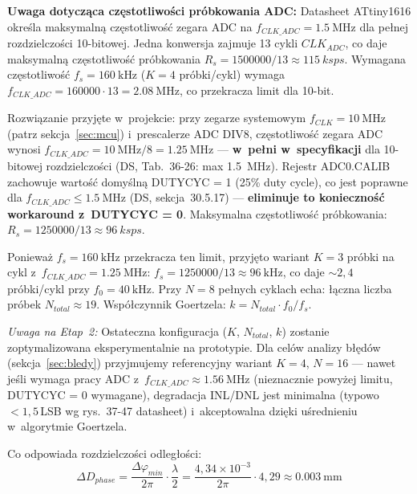 \documentclass[a4paper,11pt]{article}
\begin{document}
\textbf{Uwaga dotycząca częstotliwości próbkowania ADC:}
Datasheet ATtiny1616 określa maksymalną częstotliwość zegara ADC na
$f_{CLK\_ADC} = \SI{1,5}{\mega\hertz}$ dla pełnej rozdzielczości 10-bitowej.
Jedna konwersja zajmuje 13 cykli $CLK_{ADC}$, co daje maksymalną częstotliwość
próbkowania $R_s = 1500000/13 \approx \SI{115}{ksps}$. Wymagana częstotliwość
$f_s = \SI{160}{\kilo\hertz}$ ($K = 4$ próbki/cykl) wymaga
$f_{CLK\_ADC} = 160000 \cdot 13 = \SI{2,08}{\mega\hertz}$,
co przekracza limit dla 10-bit.

Rozwiązanie przyjęte w~projekcie: przy zegarze systemowym $f_{CLK} = \SI{10}{\mega\hertz}$
(patrz sekcja~\ref{sec:mcu}) i~prescalerze ADC DIV8, częstotliwość zegara ADC wynosi
$f_{CLK\_ADC} = \SI{10}{\mega\hertz}/8 = \SI{1,25}{\mega\hertz}$ ---
\textbf{w~pełni w~specyfikacji} dla 10-bitowej rozdzielczości
(DS, Tab.~36-26: max \SI{1,5}{\mega\hertz}).
Rejestr ADC0.CALIB zachowuje wartość domyślną DUTYCYC = 1 (25\% duty cycle),
co jest poprawne dla $f_{CLK\_ADC} \leq \SI{1,5}{\mega\hertz}$
(DS, sekcja~30.5.17) --- \textbf{eliminuje to konieczność workaround z~DUTYCYC = 0}.
Maksymalna częstotliwość próbkowania: $R_s = 1250000/13 \approx \SI{96}{ksps}$.

Ponieważ $f_s = \SI{160}{\kilo\hertz}$ przekracza ten limit, przyjęto wariant
$K = 3$ próbki na cykl z~$f_{CLK\_ADC} = \SI{1,25}{\mega\hertz}$:
$f_s = 1250000/13 \approx \SI{96}{\kilo\hertz}$, co daje ${\sim}2{,}4$ próbki/cykl
przy $f_0 = \SI{40}{\kilo\hertz}$. Przy $N = 8$ pełnych cyklach echa: łączna
liczba próbek $N_{total} \approx 19$. Współczynnik Goertzela:
$k = N_{total} \cdot f_0/f_s$.

\textit{Uwaga na Etap~2:} Ostateczna konfiguracja ($K$, $N_{total}$, $k$)
zostanie zoptymalizowana eksperymentalnie na prototypie. Dla celów analizy
błędów (sekcja~\ref{sec:bledy}) przyjmujemy referencyjny wariant $K = 4$,
$N = 16$ --- nawet jeśli wymaga pracy ADC z~$f_{CLK\_ADC} \approx
\SI{1,56}{\mega\hertz}$ (nieznacznie powyżej limitu, DUTYCYC = 0 wymagane),
degradacja INL/DNL jest minimalna (typowo $< 1{,}5$\,LSB wg rys.~37-47
datasheet) i~akceptowalna dzięki uśrednieniu w~algorytmie Goertzela.

Co odpowiada rozdzielczości odległości:
\begin{equation}
    \Delta D_{phase} = \frac{\Delta\varphi_{min}}{2\pi} \cdot \frac{\lambda}{2}
    = \frac{4{,}34 \times 10^{-3}}{2\pi} \cdot 4{,}29 \approx \SI{0,003}{\milli\metre}
    \label{eq:phase_dist_res}
\end{equation}
\end{document}
